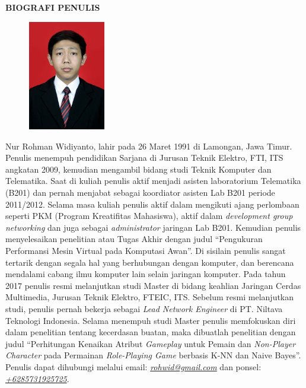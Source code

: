 \begin{center}
\large\textbf{BIOGRAFI PENULIS}
\end{center}
\vspace{1ex}

\begin{figure}
	\centering
	\vspace{-3ex}	
	\includegraphics[width=0.3\textwidth]{img/aku.jpg}
	\vspace{-4ex}
\end{figure}

\noindent Nur Rohman Widiyanto, lahir pada 26 Maret 1991 di Lamongan, Jawa Timur.
Penulis menempuh pendidikan Sarjana di Jurusan Teknik Elektro, FTI, ITS angkatan 2009, kemudian mengambil bidang studi Teknik Komputer dan Telematika. Saat di kuliah penulis aktif menjadi asisten laboratorium Telematika (B201) dan pernah menjabat sebagai koordiator asisten Lab B201 periode 2011/2012. Selama masa kuliah penulis aktif dalam mengikuti ajang perlombaan seperti PKM (Program Kreatifitas Mahasiswa), aktif dalam \textit{development group networking} dan juga sebagai \textit{administrator} jaringan Lab B201. Kemudian penulis menyelesaikan penelitian atau Tugas Akhir dengan judul ``Pengukuran Performansi Mesin Virtual pada Komputasi Awan''. Di sisilain penulis sangat tertarik dengan segala hal yang berhubungan dengan komputer, dan berencana mendalami cabang ilmu komputer lain selain jaringan komputer. Pada tahun 2017 penulis resmi melanjutkan studi Master di bidang keahlian Jaringan Cerdas Multimedia, Jurusan Teknik Elektro, FTEIC, ITS. Sebelum resmi melanjutkan studi, penulis pernah bekerja sebagai \textit{Lead Network Engineer} di PT. Niltava Teknologi Indonesia. Selama menempuh studi Master penulis memfokuskan diri dalam penelitian tentang kecerdasan buatan, maka dibuatlah penelitian dengan judul ``Perhitungan Kenaikan Atribut \textit{Gameplay} untuk Pemain dan \textit{Non-Player Character} pada Permainan \textit{Role-Playing Game} berbasis K-NN dan Naive Bayes''. Penulis dapat dihubungi melalui email: \underline{\textit{rohwid@gmail.com}} dan ponsel: \underline{\textit{+6285731925725}}.